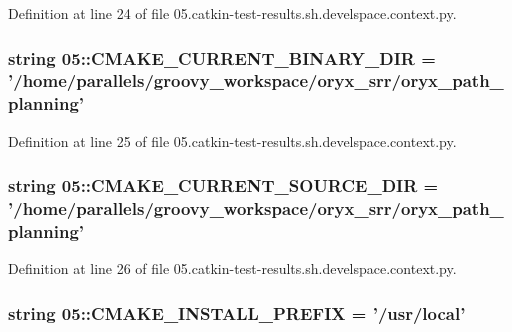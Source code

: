 \-Definition at line 24 of file 05.\-catkin-\/test-\/results.\-sh.\-develspace.\-context.\-py.

\subsubsection[{\-C\-M\-A\-K\-E\-\_\-\-C\-U\-R\-R\-E\-N\-T\-\_\-\-B\-I\-N\-A\-R\-Y\-\_\-\-D\-I\-R}]{\setlength{\rightskip}{0pt plus 5cm}string 05\-::{\bf \-C\-M\-A\-K\-E\-\_\-\-C\-U\-R\-R\-E\-N\-T\-\_\-\-B\-I\-N\-A\-R\-Y\-\_\-\-D\-I\-R} = '/home/parallels/groovy\-\_\-workspace/oryx\-\_\-srr/oryx\-\_\-path\-\_\-planning'}\label{namespace05_a6ef4e98534a41422976ec7d287741a25}


\-Definition at line 25 of file 05.\-catkin-\/test-\/results.\-sh.\-develspace.\-context.\-py.

\subsubsection[{\-C\-M\-A\-K\-E\-\_\-\-C\-U\-R\-R\-E\-N\-T\-\_\-\-S\-O\-U\-R\-C\-E\-\_\-\-D\-I\-R}]{\setlength{\rightskip}{0pt plus 5cm}string 05\-::{\bf \-C\-M\-A\-K\-E\-\_\-\-C\-U\-R\-R\-E\-N\-T\-\_\-\-S\-O\-U\-R\-C\-E\-\_\-\-D\-I\-R} = '/home/parallels/groovy\-\_\-workspace/oryx\-\_\-srr/oryx\-\_\-path\-\_\-planning'}\label{namespace05_ade586154cb60ea808020e5d853e5b800}


\-Definition at line 26 of file 05.\-catkin-\/test-\/results.\-sh.\-develspace.\-context.\-py.

\subsubsection[{\-C\-M\-A\-K\-E\-\_\-\-I\-N\-S\-T\-A\-L\-L\-\_\-\-P\-R\-E\-F\-I\-X}]{\setlength{\rightskip}{0pt plus 5cm}string 05\-::{\bf \-C\-M\-A\-K\-E\-\_\-\-I\-N\-S\-T\-A\-L\-L\-\_\-\-P\-R\-E\-F\-I\-X} = '/usr/local'}\label{namespace05_a826c62b13336f983ddb2f0e5e8844294}


